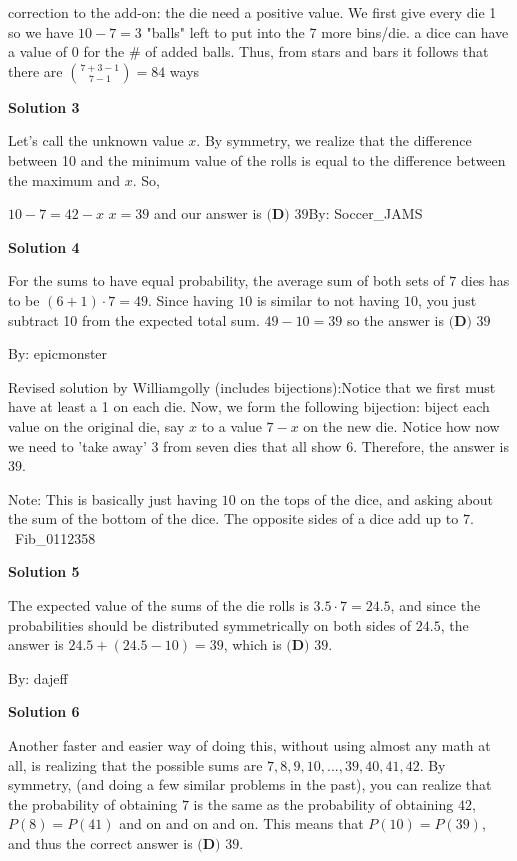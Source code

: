 \begin{enumerate}
 correction to the add-on: the die need a positive value. We first give every die 1 so we have $10-7=3$ "balls" left to put into the 7 more bins/die. a dice can have a value of 0 for the \# of added balls. Thus, from stars and bars it follows that there are $\binom{7+3-1}{7-1}=84$ ways

 



\textbf{Solution 3}

Let's call the unknown value $x$. By symmetry, we realize that the difference between 10 and the minimum value of the rolls is equal to the difference between the maximum and $x$. So, 

 $10 - 7 = 42- x$
$x = 39$ and our answer is  $\boxed{\textbf{(D)} \text{ 39}}$By: Soccer\_JAMS

 



\textbf{Solution 4}

For the sums to have equal probability, the average sum of both sets of $7$ dies has to be $(6+1)\cdot 7 = 49$. Since having $10$ is similar to not having $10$, you just subtract 10 from the expected total sum. $49 - 10 = 39$ so the answer is $\boxed{\textbf{(D)} \text{ 39}}$

 By: epicmonster

 Revised solution by Williamgolly (includes bijections):Notice that we first must have at least a 1 on each die.  Now, we form the following bijection: biject each value on the original die, say $x$ to a value $7-x$ on the new die. Notice how now we need to 'take away' 3 from seven dies that all show 6.  Therefore, the answer is 39.

 Note: This is basically just having $10$ on the tops of the dice, and asking about the sum of the bottom of the dice. The opposite sides of a dice add up to $7$. ~Fib\_0112358

 



\textbf{Solution 5}

The expected value of the sums of the die rolls is $3.5\cdot7=24.5$, and since the probabilities should be distributed symmetrically on both sides of $24.5$, the answer is $24.5+(24.5-10)=39$, which is $\boxed{\textbf{(D)} \text{ 39}}$.

 By: dajeff

 



\textbf{Solution 6}

Another faster and easier way of doing this, without using almost any math at all, is realizing that the possible sums are ${7,8,9,10,...,39,40,41,42}$. By symmetry, (and doing a few similar problems in the past), you can realize that the probability of obtaining $7$ is the same as the probability of obtaining $42$, $P(8)=P(41)$ and on and on and on. This means that $P(10)=P(39)$, and thus the correct answer is $\boxed{\textbf{(D)} \text{ 39}}$.


\end{enumerate}

